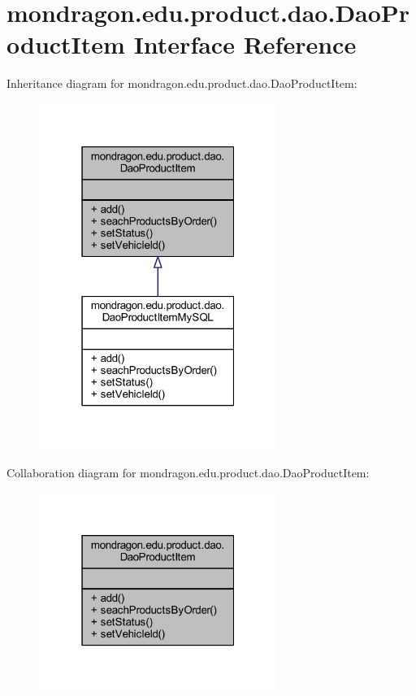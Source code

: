\hypertarget{interfacemondragon_1_1edu_1_1product_1_1dao_1_1_dao_product_item}{}\section{mondragon.\+edu.\+product.\+dao.\+Dao\+Product\+Item Interface Reference}
\label{interfacemondragon_1_1edu_1_1product_1_1dao_1_1_dao_product_item}


Inheritance diagram for mondragon.\+edu.\+product.\+dao.\+Dao\+Product\+Item\+:\nopagebreak
\begin{figure}[H]
\begin{center}
\leavevmode
\includegraphics[width=220pt]{interfacemondragon_1_1edu_1_1product_1_1dao_1_1_dao_product_item__inherit__graph}
\end{center}
\end{figure}


Collaboration diagram for mondragon.\+edu.\+product.\+dao.\+Dao\+Product\+Item\+:\nopagebreak
\begin{figure}[H]
\begin{center}
\leavevmode
\includegraphics[width=220pt]{interfacemondragon_1_1edu_1_1product_1_1dao_1_1_dao_product_item__coll__graph}
\end{center}
\end{figure}
